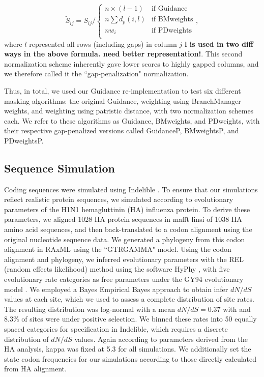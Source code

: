 \documentclass[12pt]{article}
\begin{document}
\begin{equation} \widetilde{S}_{ij} = S_{ij} \bigg/ \left\{ \begin{array}{rl}
              n\times (l-1)                                   &\mbox{if Guidance} \\
              n\sum d_p(i,l)                         &\mbox{if BMweights} \\
   		  nw_i                                       &\mbox{if PDweights} \\          
         \end{array} \right.,
\end{equation}
where $l$ represented all rows (including gaps) in column $j$ \textbf{l is used in two diff ways in the above formula. need better representation!}. This second normalization scheme inherently gave lower scores to highly gapped columns, and we therefore called it the ``gap-penalization" normalization.

Thus, in total, we used our Guidance re-implementation to test six different masking algorithms: the original Guidance, weighting using BranchManager weights, and weighting using patristic distance, with two normalization schemes each. We refer to these algorithms as Guidance, BMweights, and PDweights, with their respective gap-penalized versions called GuidanceP, BMweightsP, and PDweightsP.



\subsection*{Sequence Simulation}
Coding sequences were simulated using Indelible \citep{Fletcher2009}. To ensure that our simulations reflect realistic protein sequences, we simulated according to evolutionary parameters of the H1N1 hemagluttinin (HA) influenza protein. To derive these parameters, we aligned 1028 HA protein sequences in mafft linsi \citep{Katoh2005} of 1038 HA amino acid sequences, and then back-translated to a codon alignment using the original nucleotide sequence data. We generated a phylogeny from this codon alignment in RAxML \citep{Stamatakis2006} using the ``GTRGAMMA" model. Using the codon alignment and phylogeny, we inferred evolutionary parameters with the REL (random effects likelihood)  method \citep{NielsenYang1998} using the software HyPhy \citep{Pond2005}, with five evolutionary rate categories as free parameters under the GY94 evolutionary model \citep{GoldmanYang1994}. We employed a Bayes Empirical Bayes approach \citep{Yang2000} to obtain infer $dN/dS$ values at each site, which we used to assess a complete distribution of site rates. The resulting distribution was log-normal with a mean $dN/dS = 0.37$ with and 8.3\% of sites were under positive selection. We binned these rates into 50 equally spaced categories for specification in Indelible, which requires a discrete distribution of $dN/dS$ values. Again according to parameters derived from the HA analysis, kappa was fixed at 5.3 for all simulations. We additionally set the state codon frequencies for our simulations according to those directly calculated from HA alignment. 
\end{document}
